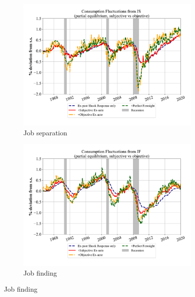 \begin{figure}[ht]
    \centering
    \caption{\textbf{Monthly} Consumption Fluctuations due to Unemployment Risks}
    \label{fig:pe_decompose_sub_obj_monthly}

    \begin{subfigure}{0.32\linewidth}
         \caption*{Job separation}
        \includegraphics[width=\linewidth]{Figures/consumption_pe_JS_deviation_machine_as_rational_monthly.pdf}
   
    \end{subfigure}
    \hfill
    \begin{subfigure}{0.32\linewidth}
         \caption*{Job finding}
        \includegraphics[width=\linewidth]{Figures/consumption_pe_JF_deviation_machine_as_rational_monthly.pdf}
   

\end{subfigure}
\end{figure}
